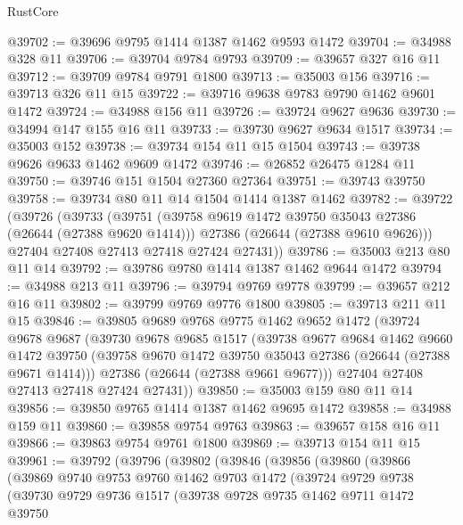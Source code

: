 \begin{lexlean}{RustCore}
\begin{coremodule}
@39702 := @39696 @9795 @1414 @1387 @1462 @9593 @1472
@39704 := @34988 @328 @11
@39706 := @39704 @9784 @9793
@39709 := @39657 @327 @16 @11
@39712 := @39709 @9784 @9791 @1800
@39713 := @35003 @156
@39716 := @39713 @326 @11 @15
@39722 := @39716 @9638 @9783 @9790 @1462 @9601 @1472
@39724 := @34988 @156 @11
@39726 := @39724 @9627 @9636
@39730 := @34994 @147 @155 @16 @11
@39733 := @39730 @9627 @9634 @1517
@39734 := @35003 @152
@39738 := @39734 @154 @11 @15 @1504
@39743 := @39738 @9626 @9633 @1462 @9609 @1472
@39746 := @26852 @26475 @1284 @11
@39750 := @39746 @151 @1504 @27360 @27364
@39751 := @39743 @39750
@39758 := @39734 @80 @11 @14 @1504 @1414 @1387 @1462
@39782 := @39722
    (@39726
      (@39733
        (@39751
          (@39758 @9619 @1472 @39750 @35043 @27386 (@26644 (@27388 @9620 @1414)))
          @27386
          (@26644 (@27388 @9610 @9626)))
        @27404
        @27408
        @27413
        @27418
        @27424
        @27431))
@39786 := @35003 @213 @80 @11 @14
@39792 := @39786 @9780 @1414 @1387 @1462 @9644 @1472
@39794 := @34988 @213 @11
@39796 := @39794 @9769 @9778
@39799 := @39657 @212 @16 @11
@39802 := @39799 @9769 @9776 @1800
@39805 := @39713 @211 @11 @15
@39846 := @39805
    @9689
    @9768
    @9775
    @1462
    @9652
    @1472
    (@39724
      @9678
      @9687
      (@39730
        @9678
        @9685
        @1517
        (@39738
          @9677
          @9684
          @1462
          @9660
          @1472
          @39750
          (@39758 @9670 @1472 @39750 @35043 @27386 (@26644 (@27388 @9671 @1414)))
          @27386
          (@26644 (@27388 @9661 @9677)))
        @27404
        @27408
        @27413
        @27418
        @27424
        @27431))
@39850 := @35003 @159 @80 @11 @14
@39856 := @39850 @9765 @1414 @1387 @1462 @9695 @1472
@39858 := @34988 @159 @11
@39860 := @39858 @9754 @9763
@39863 := @39657 @158 @16 @11
@39866 := @39863 @9754 @9761 @1800
@39869 := @39713 @154 @11 @15
@39961 := @39792
    (@39796
      (@39802
        (@39846
          (@39856
            (@39860
              (@39866
                (@39869
                  @9740
                  @9753
                  @9760
                  @1462
                  @9703
                  @1472
                  (@39724
                    @9729
                    @9738
                    (@39730
                      @9729
                      @9736
                      @1517
                      (@39738
                        @9728
                        @9735
                        @1462
                        @9711
                        @1472
                        @39750

\end{coremodule}
\end{lexlean}
